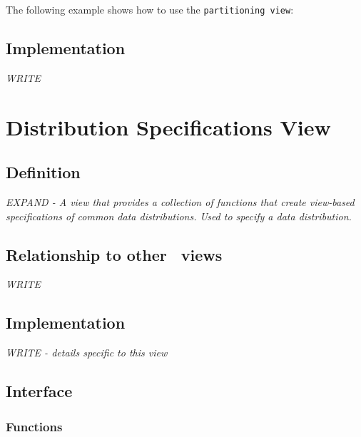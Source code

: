 The following example shows how to use the \texttt{partitioning view}:


\subsection{Implementation} \label{sec-dist-part-vw-impl}

\textit{WRITE}


\section{Distribution Specifications View} \label{sec-dist-spec-vw}

\subsection{Definition} 

\textit{EXPAND - A view that provides a collection of functions that create view-based specifications of common data distributions.  Used to specify a data distribution.}

\subsection{Relationship to other \stapl\ views}

\textit{WRITE}

\subsection{Implementation}

\textit{WRITE - details specific to this view}

\subsection{Interface} \label{sec-dist-spec-vw-inter}

\subsubsection{Functions}

